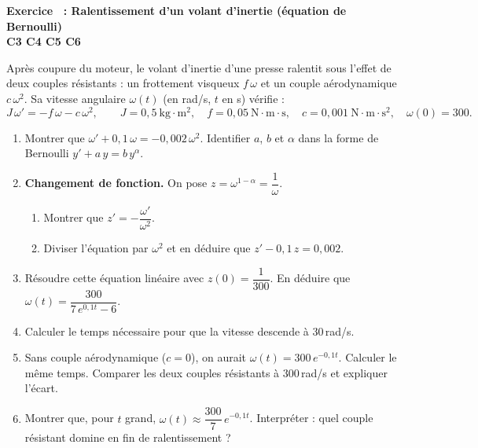 \documentclass[a4paper,11pt]{article}
\newcounter{exo}
\newcommand{\exo}[4]{\needspace{0.5\textheight}\refstepcounter{exo}\label{exo:\theexo}\vspace{8pt}%
\begin{tcolorbox}[colback=uimmlightblue, colframe=uimmblue, boxrule=0.8pt, arc=2pt, left=6pt, right=6pt, top=3pt, bottom=3pt]
{\color{uimmblue}\bfseries Exercice \theexo\ : #1}\\
{\small\color{uimmred}\bfseries #2\quad #3}%
\if\relax\detokenize{#4}\relax\else\\{\footnotesize\color{uimmgray}\itshape #4}\fi
\end{tcolorbox}}
\newcommand{\rep}[1]{\par\noindent\begin{minipage}[t][#1cm]{\linewidth}\mbox{}\end{minipage}\par}
\begin{document}
\exo{Ralentissement d'un volant d'inertie (équation de Bernoulli)}{C3 C4 C5 C6}{[S01] [C01] [C02]}{}
Après coupure du moteur, le volant d'inertie d'une presse ralentit sous l'effet de deux couples résistants : un frottement visqueux $f\,\omega$ et un couple aérodynamique $c\,\omega^2$. Sa vitesse angulaire $\omega(t)$ (en rad/s, $t$ en s) vérifie :
\[
J\,\omega' = -f\,\omega - c\,\omega^2, \qquad J = 0{,}5\ \text{kg}\cdot\text{m}^2, \quad f = 0{,}05\ \text{N}\cdot\text{m}\cdot\text{s}, \quad c = 0{,}001\ \text{N}\cdot\text{m}\cdot\text{s}^2, \quad \omega(0) = 300 .
\]
\begin{enumerate}
  \needspace{3.5cm}
  \item Montrer que $\omega' + 0{,}1\,\omega = -0{,}002\,\omega^2$. Identifier $a$, $b$ et $\alpha$ dans la forme de Bernoulli $y' + a\,y = b\,y^{\alpha}$.
  \rep{2}
  \needspace{5cm}
  \item \textbf{Changement de fonction.} On pose $z = \omega^{1-\alpha} = \dfrac{1}{\omega}$.
  \begin{enumerate}
    \item Montrer que $z' = -\dfrac{\omega'}{\omega^2}$.
    \rep{1.5}
    \item Diviser l'équation par $\omega^2$ et en déduire que $z' - 0{,}1\,z = 0{,}002$.
    \rep{2.5}
  \end{enumerate}
  \needspace{5cm}
  \item Résoudre cette équation linéaire avec $z(0) = \dfrac{1}{300}$. En déduire que $\omega(t) = \dfrac{300}{7\,e^{0{,}1 t} - 6}$.
  \rep{4}
  \needspace{3cm}
  \item Calculer le temps nécessaire pour que la vitesse descende à $30$\,rad/s.
  \rep{2}
  \needspace{4cm}
  \item Sans couple aérodynamique ($c = 0$), on aurait $\omega(t) = 300\,e^{-0{,}1 t}$. Calculer le même temps. Comparer les deux couples résistants à $300$\,rad/s et expliquer l'écart.
  \rep{3}
  \needspace{3.5cm}
  \item Montrer que, pour $t$ grand, $\omega(t) \approx \dfrac{300}{7}\,e^{-0{,}1 t}$. Interpréter : quel couple résistant domine en fin de ralentissement ?
  \rep{3}
\end{enumerate}
\end{document}
